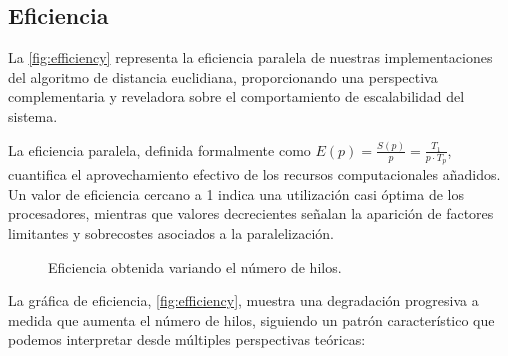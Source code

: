     \subsection{Eficiencia}

        La \autoref{fig:efficiency} representa la eficiencia paralela de nuestras implementaciones del algoritmo de distancia euclidiana, proporcionando una perspectiva complementaria y reveladora sobre el comportamiento de escalabilidad del sistema.
        
        La eficiencia paralela, definida formalmente como $E(p) = \frac{S(p)}{p} = \frac{T_1}{p \cdot T_p}$, cuantifica el aprovechamiento efectivo de los recursos computacionales añadidos. Un valor de eficiencia cercano a 1 indica una utilización casi óptima de los procesadores, mientras que valores decrecientes señalan la aparición de factores limitantes y sobrecostes asociados a la paralelización.

        \begin{figure}[H]
            \centering
            \caption{Eficiencia obtenida variando el número de hilos.}
            \label{fig:efficiency}
        \end{figure}

        La gráfica de eficiencia, \autoref{fig:efficiency}, muestra una degradación progresiva a medida que aumenta el número de hilos, siguiendo un patrón característico que podemos interpretar desde múltiples perspectivas teóricas:

